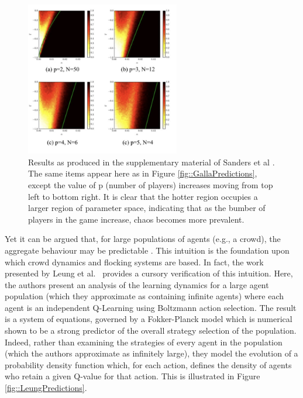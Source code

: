 \documentclass[.../main.tex]{subfiles}
\begin{document}
    \begin{figure}[h]
    	\centering
    	\includegraphics[width=0.6\textwidth]{Figures/GallaPrevalence}
    	\caption{ \label{fig::GallaPrevalence} Results as produced in
          the supplementary material of Sanders et al
          \cite{Sanders2018}. The same items appear here as in Figure
          \ref{fig::GallaPredictions}, except the value of p (number
          of players) increases moving from top left to bottom
          right. It is clear that the hotter region occupies a larger
          region of parameter space, indicating that as the bumber of
          players in the game increase, chaos becomes more prevalent.}
    \end{figure}

    Yet it can be argued that, for large populations of agents (e.g.,
    a crowd), the aggregate behaviour may be predictable . This
    intuition is the foundation upon which crowd dynamics and flocking
    systems are based. In fact, the work presented by Leung et
    al.~\cite{Hu2019} provides a cursory verification of this
    intuition. Here, the authors present an analysis of the learning
    dynamics for a large agent population (which they approximate as
    containing infinite agents) where each agent is an independent
    Q-Learning using Boltzmann action selection. The result is a
    system of equations, governed by a Fokker-Planck model which is
    numerical shown to be a strong predictor of the overall strategy
    selection of the population. Indeed, rather than examining the
    strategies of every agent in the population (which the authors
    approximate as infinitely large), they model the evolution of a
    probability density function which, for each action, defines the
    density of agents who retain a given Q-value for that action. This
    is illustrated in Figure \ref{fig::LeungPredictions}.
\end{document}
